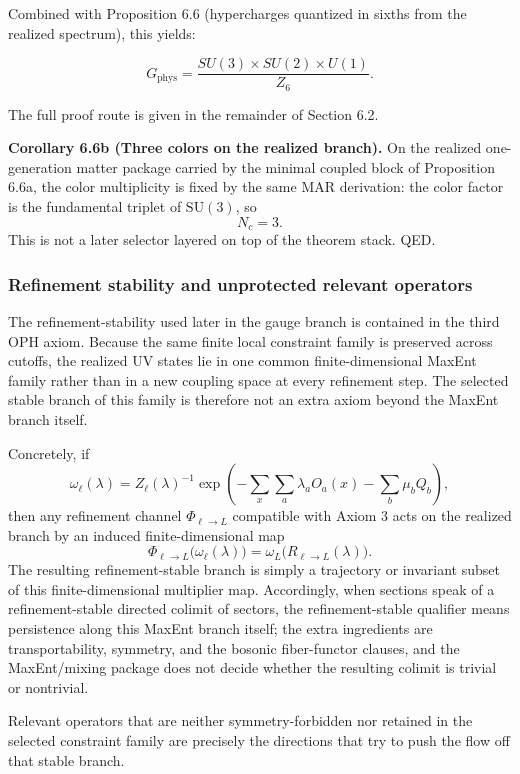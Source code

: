 Combined with Proposition 6.6 (hypercharges quantized in sixths from the realized spectrum), this yields:

\[
G_{\mathrm{phys}} = \frac{SU(3) \times SU(2) \times U(1)}{Z_6}.
\]

The full proof route is given in the remainder of Section 6.2.

\textbf{Corollary 6.6b (Three colors on the realized branch).} On the realized one-generation matter package carried by the minimal coupled block of Proposition 6.6a, the color multiplicity is fixed by the same MAR derivation: the color factor is the fundamental triplet of \(\mathrm{SU}(3)\), so
\[
N_c=3.
\]
This is not a later selector layered on top of the theorem stack. QED.

\subsubsection{Refinement stability and unprotected relevant operators}\label{63-refinement-stability-and-unprotected-relevant-operators}

The refinement-stability used later in the gauge branch is contained in the third OPH axiom. Because the same finite local constraint family is preserved across cutoffs, the realized UV states lie in one common finite-dimensional MaxEnt family rather than in a new coupling space at every refinement step. The selected stable branch of this family is therefore not an extra axiom beyond the MaxEnt branch itself.

Concretely, if
\[
\omega_\ell(\lambda)
=
Z_\ell(\lambda)^{-1}
\exp\!\left(
-\sum_x \sum_a \lambda_a O_a(x)-\sum_b \mu_b Q_b
\right),
\]
then any refinement channel \(\Phi_{\ell\to L}\) compatible with Axiom 3 acts on the realized branch by an induced finite-dimensional map
\[
\Phi_{\ell\to L}\bigl(\omega_\ell(\lambda)\bigr)
=
\omega_L\!\bigl(R_{\ell\to L}(\lambda)\bigr).
\]
The resulting refinement-stable branch is simply a trajectory or invariant subset of this finite-dimensional multiplier map. Accordingly, when sections speak of a refinement-stable directed colimit of sectors, the refinement-stable qualifier means persistence along this MaxEnt branch itself; the extra ingredients are transportability, symmetry, and the bosonic fiber-functor clauses, and the MaxEnt/mixing package does not decide whether the resulting colimit is trivial or nontrivial.

Relevant operators that are neither symmetry-forbidden nor retained in the selected constraint family are precisely the directions that try to push the flow off that stable branch.

